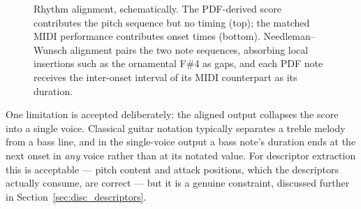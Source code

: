 \begin{figure}[htbp]
    \centering
    \caption{Rhythm alignment, schematically. The PDF-derived score contributes the pitch sequence but no timing (top); the matched MIDI performance contributes onset times (bottom). Needleman--Wunsch alignment pairs the two note sequences, absorbing local insertions such as the ornamental F\#4 as gaps, and each PDF note receives the inter-onset interval of its MIDI counterpart as its duration.}
    \label{fig:alignment}
\end{figure}

One limitation is accepted deliberately: the aligned output collapses the score into a single voice. Classical guitar notation typically separates a treble melody from a bass line, and in the single-voice output a bass note's duration ends at the next onset in \emph{any} voice rather than at its notated value. For descriptor extraction this is acceptable --- pitch content and attack positions, which the descriptors actually consume, are correct --- but it is a genuine constraint, discussed further in Section~\ref{sec:disc_descriptors}.

